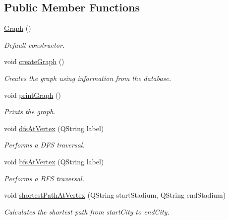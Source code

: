 \subsection*{Public Member Functions}
\begin{DoxyCompactItemize}
\item 
\mbox{\label{class_graph_ae4c72b8ac4d693c49800a4c7e273654f}} 
\hyperlink{class_graph_ae4c72b8ac4d693c49800a4c7e273654f}{Graph} ()
\begin{DoxyCompactList}\small\item\em Default constructor. \end{DoxyCompactList}\item 
\mbox{\label{class_graph_a33a161c48acd375508bbf95e697bf453}} 
void \hyperlink{class_graph_a33a161c48acd375508bbf95e697bf453}{create\+Graph} ()
\begin{DoxyCompactList}\small\item\em Creates the graph using information from the database. \end{DoxyCompactList}\item 
\mbox{\label{class_graph_a5ac05db53839e72af76cdb2bafe88b77}} 
void \hyperlink{class_graph_a5ac05db53839e72af76cdb2bafe88b77}{print\+Graph} ()
\begin{DoxyCompactList}\small\item\em Prints the graph. \end{DoxyCompactList}\item 
void \hyperlink{class_graph_a2a65cf186c6fb2b2cc729c5912f64c72}{dfs\+At\+Vertex} (Q\+String label)
\begin{DoxyCompactList}\small\item\em Performs a D\+FS traversal. \end{DoxyCompactList}\item 
void \hyperlink{class_graph_a11be2135c68163907d6bb1a268316876}{bfs\+At\+Vertex} (Q\+String label)
\begin{DoxyCompactList}\small\item\em Performs a B\+FS traversal. \end{DoxyCompactList}\item 
void \hyperlink{class_graph_a82253781b5b51b8a91db5adbc7e96367}{shortest\+Path\+At\+Vertex} (Q\+String start\+Stadium, Q\+String end\+Stadium)
\begin{DoxyCompactList}\small\item\em Calculates the shortest path from start\+City to end\+City. \end{DoxyCompactList}\item 

\end{DoxyCompactItemize}
